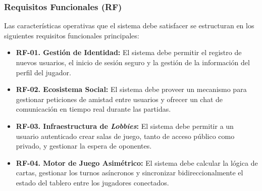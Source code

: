 \subsubsection{Requisitos Funcionales (RF)}

Las características operativas que el sistema debe satisfacer se estructuran en los siguientes requisitos funcionales principales:
\begin{itemize}
    \item \textbf{RF-01. Gestión de Identidad:} El sistema debe permitir el registro de nuevos usuarios, el inicio de sesión seguro y la gestión de la información del perfil del jugador.
    \item \textbf{RF-02. Ecosistema Social:} El sistema debe proveer un mecanismo para gestionar peticiones de amistad entre usuarios y ofrecer un chat de comunicación en tiempo real durante las partidas.
    \item \textbf{RF-03. Infraestructura de \textit{Lobbies}:} El sistema debe permitir a un usuario autenticado crear salas de juego, tanto de acceso público como privado, y gestionar la espera de oponentes.
    \item \textbf{RF-04. Motor de Juego Asimétrico:} El sistema debe calcular la lógica de cartas, gestionar los turnos asíncronos y sincronizar bidireccionalmente el estado del tablero entre los jugadores conectados.
\end{itemize}

